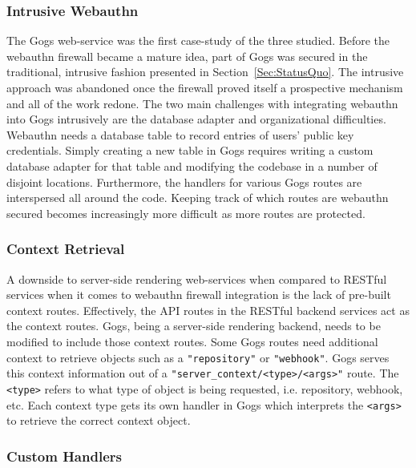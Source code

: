 \subsubsection{Intrusive Webauthn}

The Gogs web-service was the first case-study of the three studied. Before the webauthn firewall became a mature idea, part of Gogs was secured in the traditional, intrusive fashion presented in Section~\ref{Sec:StatusQuo}. The intrusive approach was abandoned once the firewall proved itself a prospective mechanism and all of the work redone. The two main challenges with integrating webauthn into Gogs intrusively are the database adapter and organizational difficulties. Webauthn needs a database table to record entries of users' public key credentials. Simply creating a new table in Gogs requires writing a custom database adapter for that table and modifying the codebase in a number of disjoint locations. Furthermore, the handlers for various Gogs routes are interspersed all around the code. Keeping track of which routes are webauthn secured becomes increasingly more difficult as more routes are protected.

\subsubsection{Context Retrieval}

A downside to server-side rendering web-services when compared to RESTful services when it comes to webauthn firewall integration is the lack of pre-built context routes. Effectively, the API routes in the RESTful backend services act as the context routes. Gogs, being a server-side rendering backend, needs to be modified to include those context routes. Some Gogs routes need additional context to retrieve objects such as a \lstinline{"repository"} or \lstinline{"webhook"}. Gogs serves this context information out of a \lstinline{"server_context/<type>/<args>"} route. The \lstinline{<type>} refers to what type of object is being requested, i.e. repository, webhook, etc. Each context type gets its own handler in Gogs which interprets the \lstinline{<args>} to retrieve the correct context object.


\subsubsection{Custom Handlers}

